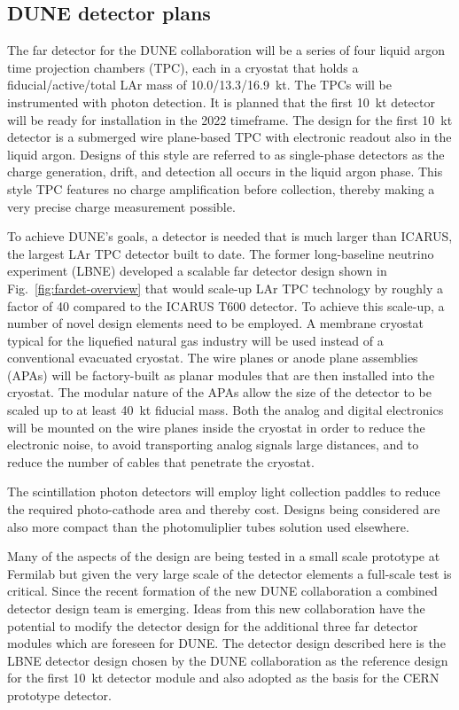 \label{singlephasedet}

\subsection{DUNE detector plans}

The far detector for the DUNE collaboration will be a series of four liquid argon time projection chambers (TPC), each in a cryostat that holds a fiducial/active/total LAr mass of 10.0/13.3/16.9~kt. The TPCs will be instrumented with photon detection. It is planned that the first 10~kt detector will be ready for installation in the 2022 timeframe. 
The design for the first 10~kt detector is a submerged wire plane-based TPC with electronic readout also in the liquid argon.  Designs of this style are referred to as single-phase detectors as the charge generation, drift, and detection all occurs in the liquid argon phase.  This style TPC features no charge amplification before collection, thereby making a very precise charge measurement possible. 


To achieve DUNE's goals, a detector is needed that is much larger than ICARUS, the largest LAr TPC detector built to date. The former long-baseline neutrino experiment (LBNE) developed a scalable far detector design shown in Fig.~\ref{fig:fardet-overview} that would scale-up LAr TPC technology by roughly a factor of 40 compared to the ICARUS T600 detector. To achieve this scale-up, a number of novel design elements need to be employed. A membrane cryostat typical for the liquefied natural gas industry will be used instead of a conventional evacuated cryostat.  The wire planes or anode plane assemblies (APAs) will be factory-built as planar modules that are then installed into the cryostat. The modular nature of the APAs allow the size of the detector to be scaled up to at least 40~kt fiducial mass. Both the analog and digital electronics will be mounted on the wire planes inside the cryostat in order to reduce the electronic noise, to avoid transporting analog signals large distances, and to reduce the number of cables that penetrate the cryostat. 

The scintillation photon detectors will employ light collection paddles to reduce the required photo-cathode area and thereby cost.  Designs being considered are also more compact than the photomuliplier tubes solution used elsewhere.

Many of the aspects of the design are being tested in a small scale prototype at Fermilab but given the very large scale of the detector elements a full-scale test is critical. 
Since the recent formation of the new DUNE collaboration a combined detector design team is emerging. 
Ideas from this new collaboration have the potential to modify the detector design for the additional three far detector modules
which are foreseen for DUNE.
The detector design described here is the LBNE detector design chosen by the DUNE collaboration as the reference design for the first 10~kt 
detector module and also adopted as the basis for the CERN prototype detector.


